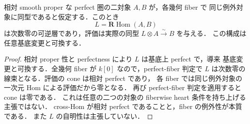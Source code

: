 \begin{lemma}[例外対象のfiberwise同型と相対線束]
\label{lem:qa-relative-exceptional-line-comparison}
相対 smooth proper な perfect 圏の二対象 $A,B$ が，各幾何 fiber で
同じ例外対象に同型であると仮定する．このとき
\[
 L=\mathbf R\operatorname{Hom}(A,B)
\]
は次数零の可逆層であり，評価は実際の同型
$L\otimes A\xrightarrow{\sim}B$ を与える．
この構成は任意基底変更と可換する．
\end{lemma}
\begin{proof}
相対 proper 性と perfectness により $L$ は基底上 perfect で，導来
基底変更と可換する．全幾何 fiber が $k[0]$ なので，perfect-fiber 判定で
$L$ は次数零の線束となる．評価の cone は相対 perfect であり，
各 fiber では同じ例外対象の一次元 Hom による評価だから零となる．
再び perfect-fiber 判定を適用すると cone は零である．
これは任意の二つの対象の fiberwise heart 条件を持ち上げる主張ではない．
cross-Hom が相対 perfect であることと，fiber の例外性が本質である．
また $L$ の自明性は主張していない．
\end{proof}

